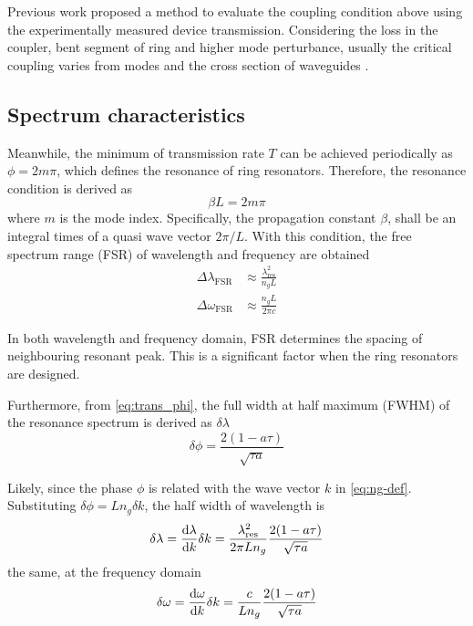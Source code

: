 Previous work \cite{Yusuke2017} proposed a method to evaluate the coupling condition above using the experimentally measured device transmission. Considering the loss in the coupler, bent segment of ring and higher mode perturbance, usually the critical coupling varies from modes and the cross section of waveguides \cite{Pfeiffer2017}.

\subsection{Spectrum characteristics}
Meanwhile, the minimum of transmission rate $T$ can be achieved periodically as $\phi=2 m \pi$, which defines the resonance of ring resonators. Therefore, the resonance condition is derived as
\begin{equation}\label{eq:res-con}
    \beta L =2 m \pi
\end{equation}
where $m$ is the mode index. Specifically, the propagation constant $\beta$, shall be an integral times of a quasi wave vector $2\pi/L$. With this condition, the free spectrum range (FSR) of wavelength and frequency are obtained
\begin{align}
    \Delta \lambda_\mathrm{FSR} &\approx \frac{\lambda_\mathrm{res}^2}{n_g L} \label{eq:fsr-wl} \\
    \Delta \omega_\mathrm{FSR} &\approx \frac{n_g L}{2\pi c} \label{eq:fsr-w}
\end{align}

In both wavelength and frequency domain, FSR determines the spacing of neighbouring resonant peak. This is a significant factor when the ring resonators are designed.

Furthermore, from \autoref{eq:trans_phi}, the full width at half maximum (FWHM) of the resonance spectrum is derived as $\delta\lambda$
\begin{equation}\label{eq:fwhm_phi}
    \delta\phi = \frac{2(1- a \tau)}{\sqrt{\tau a}}
\end{equation}
\begin{figure}
    \centering
    
    \label{fig:my_label}
\end{figure}

Likely, since the phase $\phi$ is related with the wave vector $k$ in \autoref{eq:ng-def}. Substituting $\delta \phi = L n_g \delta k$, the half width of wavelength is
\begin{equation}
    \delta \lambda = \dv{\lambda}{k}\delta k = \frac{\lambda_\mathrm{res}^2}{2\pi L n_g} \frac{2(1- a \tau)}{\sqrt{\tau a}} \label{eq:fwhm_wl}
\end{equation}
the same, at the frequency domain
\begin{equation}
    \delta \omega = \dv{\omega}{k}\delta k = \frac{c}{ L n_g} \frac{2(1- a \tau)}{\sqrt{\tau a}} \label{eq:fwhm_w}
\end{equation}


